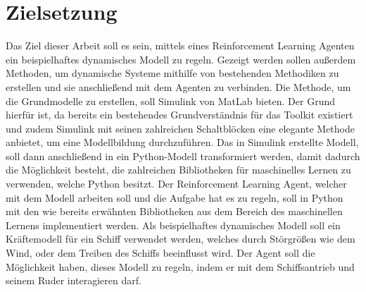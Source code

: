 \documentclass[]{iat}
\begin{document}
\section{Zielsetzung} \label{sec:zielsetzung}
Das Ziel dieser Arbeit soll es sein, mittels eines Reinforcement Learning Agenten ein beispielhaftes dynamisches Modell zu regeln. Gezeigt werden sollen außerdem Methoden, um dynamische Systeme mithilfe von bestehenden Methodiken zu erstellen und sie anschließend mit dem Agenten zu verbinden. Die Methode, um die Grundmodelle zu erstellen, soll Simulink \cite[]{simulink} von MatLab bieten. Der Grund hierfür ist, da bereits ein bestehendes Grundverständnis für das Toolkit existiert und zudem Simulink mit seinen zahlreichen Schaltblöcken eine elegante Methode anbietet, um eine Modellbildung durchzuführen. Das in Simulink erstellte Modell, soll dann anschließend in ein Python-Modell transformiert werden, damit dadurch die Möglichkeit besteht, die zahlreichen Bibliotheken für maschinelles Lernen zu verwenden, welche Python \cite[]{python} besitzt. Der Reinforcement Learning Agent, welcher mit dem Modell arbeiten soll und die Aufgabe hat es zu regeln, soll in Python mit den wie bereits erwähnten Bibliotheken aus dem Bereich des maschinellen Lernens implementiert werden. Als beispielhaftes dynamisches Modell soll ein Kräftemodell für ein Schiff verwendet werden, welches durch Störgrößen wie dem Wind, oder dem Treiben des Schiffs beeinflusst wird. Der Agent soll die Möglichkeit haben, dieses Modell zu regeln, indem er mit dem Schiffsantrieb und seinem Ruder interagieren darf.
\end{document}
